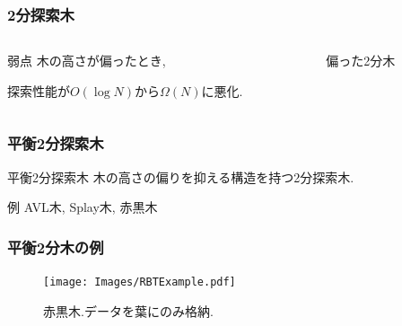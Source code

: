 \documentclass[10pt]{beamer}
\begin{document}
\begin{frame}
    \frametitle{2分探索木}

    \begin{columns}[]
        \begin{column}{0.45\textwidth}
            \begin{alertblock}{弱点}
                木の高さが偏ったとき, \par
                探索性能が$O(\log N)$から$\Omega(N)$に悪化.
            \end{alertblock}
        \end{column}
        \begin{column}{0.55\textwidth}
            \begin{figure}
                \centering
                \caption{偏った2分木}
            \end{figure}
        \end{column}
    \end{columns}

\end{frame}
\begin{frame}
    \frametitle{平衡2分探索木}
    \begin{block}{平衡2分探索木}
        木の高さの偏りを抑える構造を持つ2分探索木.
    \end{block}
    \begin{exampleblock}{例}
        AVL木, Splay木, 赤黒木
    \end{exampleblock}

\end{frame}
\begin{frame}
    \frametitle{平衡2分木の例}
    \begin{figure}
        \texttt{[image: Images/RBTExample.pdf]}
        \caption{赤黒木.データを葉にのみ格納.}
    \end{figure}

\end{frame}
\end{document}
